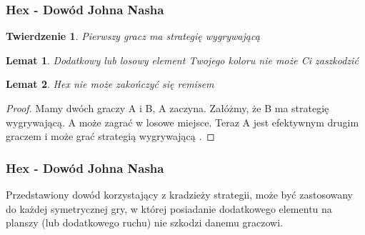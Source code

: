 \documentclass[polish,envcountsect,10pt]{beamer}
\newtheorem{twrdz}{Twierdzenie}
\newtheorem{lmt}{Lemat}
\begin{document}
                \begin{frame}
                    \frametitle{Hex - Dowód Johna Nasha}
                    \begin{twrdz}
                        Pierwszy gracz ma strategię wygrywającą
                    \end{twrdz}
                    \begin{lmt}
                        Dodatkowy lub losowy element Twojego koloru nie może Ci zaszkodzić
                    \end{lmt} \pause
                    \begin{lmt}
                        Hex nie może zakończyć się remisem
                    \end{lmt} \pause
                    \begin{proof}
                        Mamy dwóch graczy A i B, A zaczyna. Załóżmy, że B ma strategię wygrywającą. A może zagrać w losowe miejsce. Teraz A jest efektywnym drugim graczem i może grać strategią wygrywającą \cite{hex_proof}.
                    \end{proof}
                \end{frame}
                \begin{frame}
                    \frametitle{Hex - Dowód Johna Nasha}
                    Przedstawiony dowód korzystający z kradzieży strategii, może być zastosowany do każdej symetrycznej gry, w której posiadanie dodatkowego elementu na planszy (lub dodatkowego ruchu) nie szkodzi danemu graczowi.
                \end{frame} 
\end{document}
